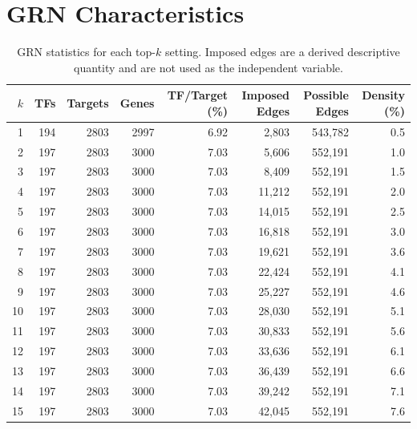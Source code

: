 \documentclass[11pt]{article}
\begin{document}
\section{GRN Characteristics}
\begin{table}[H]\centering
\caption{GRN statistics for each top-$k$ setting. Imposed edges are a derived descriptive quantity and are not used as the independent variable.}
\label{tab:grn}
\begin{tabular}{rrrrrrrr}\toprule
$k$ & TFs & Targets & Genes & TF/Target (\%) & Imposed Edges & Possible Edges & Density (\%) \\ \midrule
1 & 194 & 2803 & 2997 & 6.92 & 2,803 & 543,782 & 0.5 \\
2 & 197 & 2803 & 3000 & 7.03 & 5,606 & 552,191 & 1.0 \\
3 & 197 & 2803 & 3000 & 7.03 & 8,409 & 552,191 & 1.5 \\
4 & 197 & 2803 & 3000 & 7.03 & 11,212 & 552,191 & 2.0 \\
5 & 197 & 2803 & 3000 & 7.03 & 14,015 & 552,191 & 2.5 \\
6 & 197 & 2803 & 3000 & 7.03 & 16,818 & 552,191 & 3.0 \\
7 & 197 & 2803 & 3000 & 7.03 & 19,621 & 552,191 & 3.6 \\
8 & 197 & 2803 & 3000 & 7.03 & 22,424 & 552,191 & 4.1 \\
9 & 197 & 2803 & 3000 & 7.03 & 25,227 & 552,191 & 4.6 \\
10 & 197 & 2803 & 3000 & 7.03 & 28,030 & 552,191 & 5.1 \\
11 & 197 & 2803 & 3000 & 7.03 & 30,833 & 552,191 & 5.6 \\
12 & 197 & 2803 & 3000 & 7.03 & 33,636 & 552,191 & 6.1 \\
13 & 197 & 2803 & 3000 & 7.03 & 36,439 & 552,191 & 6.6 \\
14 & 197 & 2803 & 3000 & 7.03 & 39,242 & 552,191 & 7.1 \\
15 & 197 & 2803 & 3000 & 7.03 & 42,045 & 552,191 & 7.6 \\
\bottomrule\end{tabular}\end{table}
\end{document}
